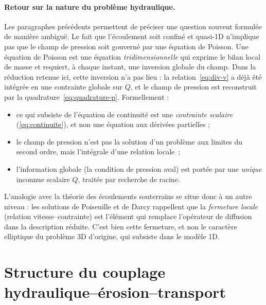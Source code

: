 \documentclass[11pt,a4paper]{report}
\begin{document}
\paragraph{Retour sur la nature du problème hydraulique.} Les paragraphes précédents permettent de
préciser une question souvent formulée de manière ambiguë. Le fait que l'écoulement soit confiné et
quasi-1D n'implique pas que le champ de pression soit gouverné par une équation de Poisson. Une équation
de Poisson est une équation \emph{tridimensionnelle} qui exprime le bilan local de masse et requiert, à
chaque instant, une inversion globale du champ. Dans la réduction retenue ici, cette inversion n'a pas
lieu : la relation~\eqref{eq:div-v} a déjà été intégrée en une contrainte globale sur \(Q\), et le champ
de pression est reconstruit par la quadrature~\eqref{eq:quadrature-p}. Formellement :
\begin{itemize}
  \item ce qui subsiste de l'équation de continuité est une \emph{contrainte scalaire} (\eqref{eq:continuite}),
        et non une équation aux dérivées partielles ;
  \item le champ de pression n'est pas la solution d'un problème aux limites du second ordre, mais
        l'intégrale d'une relation locale~;
  \item l'information globale (la condition de pression aval) est portée par une \emph{unique} inconnue
        scalaire \(Q\), traitée par recherche de racine.
\end{itemize}
L'analogie avec la théorie des écoulements souterrains se situe donc à un autre niveau : les solutions de
Poiseuille et de Darcy rappellent que la \emph{fermeture locale} (relation vitesse--contrainte) est
l'élément qui remplace l'opérateur de diffusion dans la description réduite. C'est bien cette fermeture,
et non le caractère elliptique du problème 3D d'origine, qui subsiste dans le modèle 1D.


\section{Structure du couplage hydraulique--érosion--transport}
\label{sec:couplage}
\end{document}
